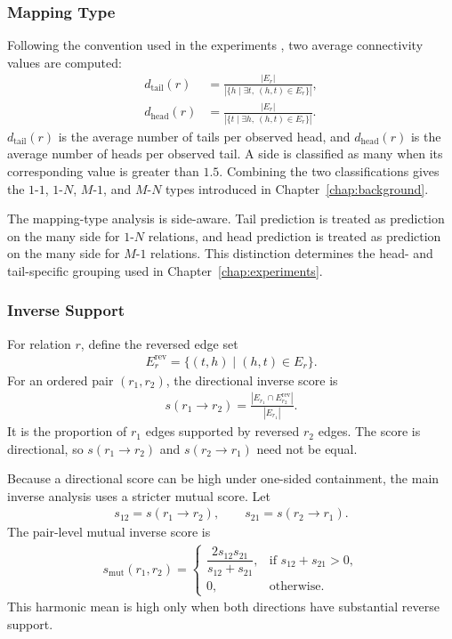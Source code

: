 \subsubsection{Mapping Type}

Following the convention used in the experiments
\citep{bordes2013translating}, two average connectivity values are computed:
\begin{align}
    d_{\mathrm{tail}}(r)
    &=
    \frac{|E_r|}
    {|\{h\mid \exists t,\ (h,t)\in E_r\}|},
    \\
    d_{\mathrm{head}}(r)
    &=
    \frac{|E_r|}
    {|\{t\mid \exists h,\ (h,t)\in E_r\}|}.
\end{align}
$d_{\mathrm{tail}}(r)$ is the average number of tails per observed head, and
$d_{\mathrm{head}}(r)$ is the average number of heads per observed tail. A
side is classified as many when its corresponding value is greater than
$1.5$. Combining the two classifications gives the $1$-$1$, $1$-$N$,
$M$-$1$, and $M$-$N$ types introduced in
Chapter~\ref{chap:background}.

The mapping-type analysis is side-aware. Tail prediction is treated as
prediction on the many side for $1$-$N$ relations, and head prediction is
treated as prediction on the many side for $M$-$1$ relations. This distinction
determines the head- and tail-specific grouping used in
Chapter~\ref{chap:experiments}.

\subsubsection{Inverse Support}

For relation $r$, define the reversed edge set
\begin{align}
    E_r^{\mathrm{rev}}
    =
    \{(t,h)\mid(h,t)\in E_r\}.
\end{align}
For an ordered pair $(r_1,r_2)$, the directional inverse score is
\begin{align}
    s(r_1\rightarrow r_2)
    =
    \frac{|E_{r_1}\cap E_{r_2}^{\mathrm{rev}}|}{|E_{r_1}|}.
\end{align}
It is the proportion of $r_1$ edges supported by reversed $r_2$ edges. The
score is directional, so $s(r_1\rightarrow r_2)$ and
$s(r_2\rightarrow r_1)$ need not be equal.

Because a directional score can be high under one-sided containment, the main
inverse analysis uses a stricter mutual score. Let
\begin{align}
    s_{12}=s(r_1\rightarrow r_2),
    \qquad
    s_{21}=s(r_2\rightarrow r_1).
\end{align}
The pair-level mutual inverse score is
\begin{align}
    s_{\mathrm{mut}}(r_1,r_2)
    =
    \begin{cases}
        \dfrac{2s_{12}s_{21}}{s_{12}+s_{21}},
        & \text{if }s_{12}+s_{21}>0,\\
        0, & \text{otherwise.}
    \end{cases}
\end{align}
This harmonic mean is high only when both directions have substantial reverse
support.

